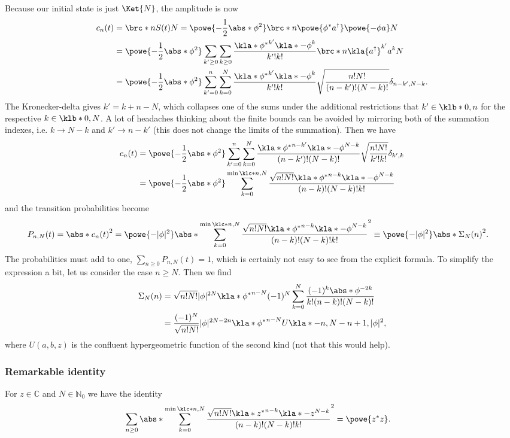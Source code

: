 \documentclass[english, parskip=full]{scrartcl}
\begin{document}
Because our initial state is just $\Ket{N}$, the amplitude is now
\begin{align}
c_n(t) &= \brc*{n}{S(t)}{N} = \powe{-\frac{1}{2} \abs*{\phi}^2} \brc*{n}{\powe{\phi^\ast a^\dagger} \powe{-\phi a}}{N}\\
&= \powe{-\frac{1}{2}\abs*{\phi}^2} \sum_{k'\ge 0} \sum_{k\ge 0} \frac{\kla*{\phi^\ast}^{k'} \kla*{-\phi}^k}{k'! k!} \brc*{n}{\kla{a^\dagger}^{k'} a^k}{N}\\
&= \powe{-\frac{1}{2}\abs*{\phi}^2} \sum_{k'=0}^n \sum_{k=0}^N \frac{\kla*{\phi^\ast}^{k'} \kla*{-\phi}^k}{k'! k!} \sqrt{\frac{n!N!}{(n-k')!(N-k)!}} \delta_{n-k',N-k}.
\end{align}
The Kronecker-delta gives $k'=k+n-N$, which collapses one of the sums under the additional restrictions that $k'\in\klb*{0,n}$ for the respective $k\in\klb*{0,N}$.
A lot of headaches thinking about the finite bounds can be avoided by mirroring both of the summation indexes, i.e. $k\rightarrow N-k$ and $k'\rightarrow n-k'$ (this does not change the limits of the summation).
Then we have
\begin{align}
c_n(t) &= \powe{-\frac{1}{2}\abs*{\phi}^2} \sum_{k'=0}^n \sum_{k=0}^N \frac{\kla*{\phi^\ast}^{n-k'} \kla*{-\phi}^{N-k}}{(n-k')! (N-k)!} \sqrt{\frac{n!N!}{k'!k!}} \delta_{k',k}\\
&= \powe{-\frac{1}{2}\abs*{\phi}^2} \sum_{k=0}^{\min\klc*{n,N}} \frac{ \sqrt{n!N!} \kla*{\phi^\ast}^{n-k} \kla*{-\phi}^{N-k}}{(n-k)! (N-k)! k!}
\end{align}
and the transition probabilities become
\begin{align}
P_{n,N}(t) &= \abs*{c_n(t)}^2 = \powe{-|\phi|^2} \abs*{\sum_{k=0}^{\min\klc*{n,N}} \frac{ \sqrt{n!N!} \kla*{\phi^\ast}^{n-k} \kla*{-\phi}^{N-k}}{(n-k)! (N-k)! k!}}^2 \equiv \powe{-|\phi|^2} \abs*{\Sigma_N(n)}^2.
\end{align}
The probabilities must add to one, $\sum_{n\ge 0} P_{n,N}(t)=1$, which is certainly not easy to see from the explicit formula.
To simplify the expression a bit, let us consider the case $n\ge N$.
Then we find
\begin{align}
\Sigma_N(n) &= \sqrt{n!N!} |\phi|^{2N} \kla*{\phi^\ast}^{n-N} (-1)^N \sum_{k=0}^{N} \frac{(-1)^k  \abs*{\phi}^{-2k}}{k! (n-k)! (N-k)!}\\
&= \frac{(-1)^N}{\sqrt{n!N!}} |\phi|^{2N-2n} \kla*{\phi^\ast}^{n-N} U\kla*{-n,N-n+1,|\phi|^2},
\end{align} %
where $U(a,b,z)$ is the confluent hypergeometric function of the second kind (not that this would help).
\subsubsection{Remarkable identity}
For $z\in\mathbb{C}$ and $N\in\mathbb{N}_0$ we have the identity
\begin{align}
\sum_{n\ge 0} \abs*{\sum_{k=0}^{\min\klc*{n,N}} \frac{ \sqrt{n!N!} \kla*{z^\ast}^{n-k} \kla*{-z}^{N-k}}{(n-k)! (N-k)! k!}}^2 &= \powe{z^\ast z}.
\end{align}
\end{document}
